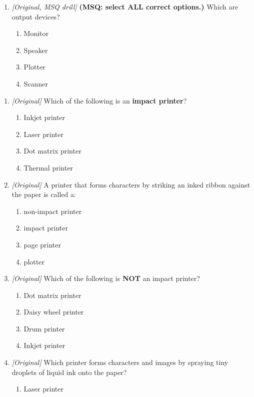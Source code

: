 \begin{enumerate}[label=\textbf{Q\arabic*.}, leftmargin=*]
\item \textit{[Original, MSQ drill]} \textbf{(MSQ: select ALL correct options.)} Which are output devices?
  \begin{enumerate}[label=\Alph*.]
\item Monitor
   \item Speaker
   \item Plotter
   \item Scanner
  \end{enumerate}

\end{enumerate}
\begin{enumerate}[label=\textbf{Q\arabic*.}, leftmargin=*]
\item \textit{[Original]} Which of the following is an \textbf{impact
  printer}?
  \begin{enumerate}[label=\Alph*.]
    \item Inkjet printer
    \item Laser printer
    \item Dot matrix printer
    \item Thermal printer
  \end{enumerate}
\item \textit{[Original]} A printer that forms characters by striking an
  inked ribbon against the paper is called a:
  \begin{enumerate}[label=\Alph*.]
    \item non-impact printer
    \item impact printer
    \item page printer
    \item plotter
  \end{enumerate}
\item \textit{[Original]} Which of the following is \textbf{NOT} an impact
  printer?
  \begin{enumerate}[label=\Alph*.]
    \item Dot matrix printer
    \item Daisy wheel printer
    \item Drum printer
    \item Inkjet printer
  \end{enumerate}
\item \textit{[Original]} Which printer forms characters and images by
  spraying tiny droplets of liquid ink onto the paper?
  \begin{enumerate}[label=\Alph*.]
    \item Laser printer

\end{enumerate}
\end{enumerate}
